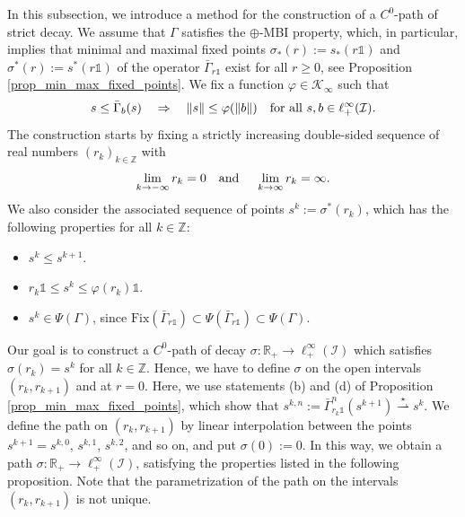 \documentclass[10pt, oneside, a4paper]{article}
\newcommand{\Z}{\mathbb{Z}}
\newcommand{\R}{\mathbb{R}}
\newcommand{\unit}{\mathds{1}}
\newcommand{\Fix}{\mathrm{Fix}}
\newcommand{\IC}{\mathcal{I}}
\newcommand{\KC}{\mathcal{K}}
\newcommand{\bsign}[1]{\bar{#1}}
\begin{document}
In this subsection, we introduce a method for the construction of a $C^0$-path of strict decay. We assume that $\Gamma$ satisfies the $\oplus$-MBI property, which, in particular, implies that minimal and maximal fixed points $\sigma_*(r) := s_*(r\unit)$ and $\sigma^*(r) := s^*(r\unit)$ of the operator $\bsign{\Gamma}_{r\unit}$ exist for all $r \geq 0$, see Proposition \ref{prop_min_max_fixed_points}. We fix a function $\varphi \in \KC_{\infty}$ such that%
\begin{equation*}
  s \leq \bsign{\Gamma}_b(s) \quad \Rightarrow \quad \|s\| \leq \varphi(\|b\|) \mbox{\quad for all\ } s,b \in \ell^{\infty}_+(\IC).%
\end{equation*}
The construction starts by fixing a strictly increasing double-sided sequence of real numbers $(r_k)_{k\in\Z}$ with%
\begin{equation*}
  \lim_{k \rightarrow -\infty}r_k = 0 \mbox{\quad and \quad} \lim_{k \rightarrow \infty}r_k = \infty.%
\end{equation*}
We also consider the associated sequence of points $s^k := \sigma^*(r_k)$, which has the following properties for all $k \in \Z$:%
\begin{itemize}
\item $s^k \leq s^{k+1}$.
\item $r_k\unit \leq s^k \leq \varphi(r_k)\unit$.
\item $s^k \in \Psi(\Gamma)$, since $\Fix(\bsign{\Gamma}_{r\unit}) \subset \Psi(\bsign{\Gamma}_{r\unit}) \subset \Psi(\Gamma)$.
\end{itemize}
Our goal is to construct a $C^0$-path of decay $\sigma:\R_+ \rightarrow \ell^{\infty}_+(\IC)$ which satisfies $\sigma(r_k) = s^k$ for all $k \in \Z$. Hence, we have to define $\sigma$ on the open intervals $(r_k,r_{k+1})$ and at $r = 0$. Here, we use statements (b) and (d) of Proposition \ref{prop_min_max_fixed_points}, which show that $s^{k,n} := \bsign{\Gamma}_{r_k\unit}^n(s^{k+1}) \stackrel{\star}{\rightharpoonup} s^k$. We define the path on $(r_k,r_{k+1})$ by linear interpolation between the points $s^{k+1} = s^{k,0}$, $s^{k,1}$, $s^{k,2}$, and so on, and put $\sigma(0) := 0$. In this way, we obtain a path $\sigma:\R_+ \rightarrow \ell^{\infty}_+(\IC)$, satisfying the properties listed in the following proposition. Note that the parametrization of the path on the intervals $(r_k,r_{k+1})$ is not unique.%
\end{document}
